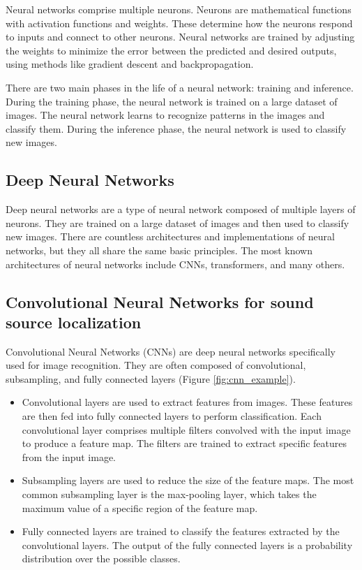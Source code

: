 Neural networks comprise multiple neurons. Neurons are mathematical functions with activation functions and weights. These determine how the neurons respond to inputs and connect to other neurons. Neural networks are trained by adjusting the weights to minimize the error between the predicted and desired outputs, using methods like gradient descent\cite{zhang2019gradient} and backpropagation\cite{Sekhar}.

There are two main phases in the life of a neural network: training and inference. During the training phase, the neural network is trained on a large dataset of images. The neural network learns to recognize patterns in the images and classify them. During the inference phase, the neural network is used to classify new images.

\subsection{Deep Neural Networks}

Deep neural networks are a type of neural network composed of multiple layers of neurons\cite{Schmidhuber_2015}. They are trained on a large dataset of images and then used to classify new images. There are countless architectures \cite{LIU201711} and implementations of neural networks, but they all share the same basic principles. The most known architectures of neural networks include CNNs\cite{oshea2015introduction}, transformers\cite{vaswani2017attention}, and many others.

\subsection{Convolutional Neural Networks for sound source localization}
\label{sec:cnn_for_ssl}
Convolutional Neural Networks (CNNs)\cite{oshea2015introduction} are deep neural networks specifically used for image recognition. They are often composed of convolutional, subsampling, and fully connected layers (Figure \ref*{fig:cnn_example}).
\begin{itemize}
    \item{} Convolutional layers are used to extract features from images. These features are then fed into fully connected layers to perform classification. Each convolutional layer comprises multiple filters convolved with the input image to produce a feature map. The filters are trained to extract specific features from the input image.
    \item{} Subsampling layers are used to reduce the size of the feature maps. The most common subsampling layer is the max-pooling layer, which takes the maximum value of a specific region of the feature map.
    \item{} Fully connected layers are trained to classify the features extracted by the convolutional layers. The output of the fully connected layers is a probability distribution over the possible classes. 
\end{itemize}

